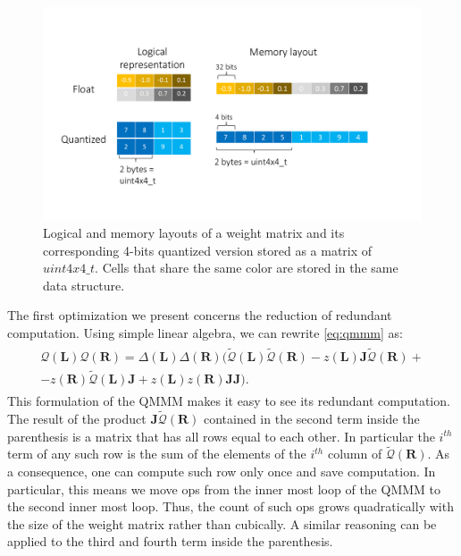 \begin{figure}
\centering
  \includegraphics[scale=0.3]{figures/uint4x4_t.pdf}
  \caption{\label{fig:uint4x4_t}Logical and memory layouts of a weight matrix and its corresponding 4-bits quantized version stored as a matrix of $uint4x4\_t$. Cells that share the same color are stored in the same data structure. }
\end{figure}


The first optimization we present concerns the reduction of redundant computation. Using simple linear algebra, we can rewrite \cref{eq:qmmm} as:
\begin{align}\label{eq:qmmm_smart}
\begin{split}
\mathcal{Q}(\mathbf{L}) \mathcal{Q}(\mathbf{R}) = \Delta(\mathbf{L}) \Delta(\mathbf{R}) ( \tilde{\mathcal{Q}}(\mathbf{L}) \tilde{\mathcal{Q}}(\mathbf{R}) - z(\mathbf{L}) \mathbf{J} \tilde{\mathcal{Q}}(\mathbf{R}) + \\
- z(\mathbf{R}) \tilde{\mathcal{Q}}(\mathbf{L}) \mathbf{J} +  z(\mathbf{L}) z(\mathbf{R}) \mathbf{J} \mathbf{J} ).
\end{split}
\end{align}
This formulation of the QMMM makes it easy to see its redundant computation. The result of the product $\mathbf{J} \tilde{\mathcal{Q}}(\mathbf{R})$ contained in the second term inside the parenthesis is a matrix that has all rows equal to each other. In particular the $i^{th}$ term of any such row is the sum of the elements of the $i^{th}$ column of  $\tilde{\mathcal{Q}}(\mathbf{R})$. As a consequence, one can compute such row only once and save computation. In particular, this means we move ops from the inner most loop of the QMMM to the second  inner most loop. Thus, the count of such ops grows quadratically with the size of the weight matrix rather than cubically. A similar reasoning can be applied to the third and fourth term inside the parenthesis.


